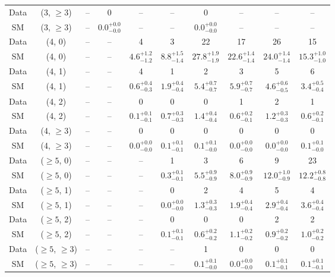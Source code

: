 \begin{table}[h!]
{\begin{tabular}{cccccccccc}
	Data & (3, $\ge3$) & -- & 0 & -- & -- & 0 & -- & -- & -- \\[0.5ex] 
	SM & (3, $\ge3$) & -- & $0.0^{+ 0.0 }_{- 0.0 }$ & -- & -- & $0.0^{+ 0.0 }_{- 0.0 }$ & -- & -- & -- \\[0.5ex] 
	Data & (4, 0) & -- & -- & 4 & 3 & 22 & 17 & 26 & 15 \\[0.5ex] 
	SM & (4, 0) & -- & -- & $4.6^{+ 1.2 }_{- 1.2 }$ & $8.8^{+ 1.5 }_{- 1.4 }$ & $27.8^{+ 1.9 }_{- 1.9 }$ & $22.6^{+ 1.4 }_{- 1.4 }$ & $24.0^{+ 1.4 }_{- 1.4 }$ & $15.3^{+ 1.0 }_{- 1.0 }$ \\[0.5ex] 
	Data & (4, 1) & -- & -- & 4 & 1 & 2 & 3 & 5 & 6 \\[0.5ex] 
	SM & (4, 1) & -- & -- & $0.6^{+ 0.4 }_{- 0.3 }$ & $1.9^{+ 0.4 }_{- 0.4 }$ & $5.4^{+ 0.7 }_{- 0.7 }$ & $5.9^{+ 0.7 }_{- 0.7 }$ & $4.6^{+ 0.6 }_{- 0.5 }$ & $3.4^{+ 0.5 }_{- 0.4 }$ \\[0.5ex] 
	Data & (4, 2) & -- & -- & 0 & 0 & 0 & 1 & 2 & 1 \\[0.5ex] 
	SM & (4, 2) & -- & -- & $0.1^{+ 0.1 }_{- 0.1 }$ & $0.7^{+ 0.3 }_{- 0.3 }$ & $1.4^{+ 0.4 }_{- 0.4 }$ & $0.6^{+ 0.2 }_{- 0.1 }$ & $1.2^{+ 0.3 }_{- 0.3 }$ & $0.6^{+ 0.2 }_{- 0.1 }$ \\[0.5ex] 
	Data & (4, $\ge3$) & -- & -- & 0 & 0 & 0 & 0 & 0 & 0 \\[0.5ex] 
	SM & (4, $\ge3$) & -- & -- & $0.0^{+ 0.0 }_{- 0.0 }$ & $0.1^{+ 0.1 }_{- 0.1 }$ & $0.1^{+ 0.1 }_{- 0.0 }$ & $0.0^{+ 0.0 }_{- 0.0 }$ & $0.0^{+ 0.0 }_{- 0.0 }$ & $0.1^{+ 0.1 }_{- 0.0 }$ \\[0.5ex] 
	Data & ($\ge5$, 0) & -- & -- & -- & 1 & 3 & 6 & 9 & 23 \\[0.5ex] 
	SM & ($\ge5$, 0) & -- & -- & -- & $0.3^{+ 0.1 }_{- 0.1 }$ & $5.5^{+ 0.9 }_{- 0.9 }$ & $8.0^{+ 0.9 }_{- 0.9 }$ & $12.0^{+ 1.0 }_{- 0.9 }$ & $12.2^{+ 0.8 }_{- 0.8 }$ \\[0.5ex] 
	Data & ($\ge5$, 1) & -- & -- & -- & 0 & 2 & 4 & 5 & 4 \\[0.5ex] 
	SM & ($\ge5$, 1) & -- & -- & -- & $0.0^{+ 0.0 }_{- 0.0 }$ & $1.3^{+ 0.3 }_{- 0.3 }$ & $1.9^{+ 0.4 }_{- 0.4 }$ & $2.9^{+ 0.4 }_{- 0.4 }$ & $3.6^{+ 0.4 }_{- 0.4 }$ \\[0.5ex] 
	Data & ($\ge5$, 2) & -- & -- & -- & 0 & 0 & 0 & 2 & 2 \\[0.5ex] 
	SM & ($\ge5$, 2) & -- & -- & -- & $0.1^{+ 0.1 }_{- 0.1 }$ & $0.6^{+ 0.2 }_{- 0.2 }$ & $1.1^{+ 0.2 }_{- 0.2 }$ & $0.9^{+ 0.2 }_{- 0.2 }$ & $1.0^{+ 0.2 }_{- 0.2 }$ \\[0.5ex] 
	Data & ($\ge5$, $\ge3$) & -- & -- & -- & -- & 1 & 0 & 0 & 0 \\[0.5ex] 
	SM & ($\ge5$, $\ge3$) & -- & -- & -- & -- & $0.1^{+ 0.1 }_{- 0.0 }$ & $0.0^{+ 0.0 }_{- 0.0 }$ & $0.1^{+ 0.1 }_{- 0.1 }$ & $0.1^{+ 0.1 }_{- 0.1 }$ \\[0.5ex] 
	\hline
	\hline
\end{tabular}}
\end{table}
